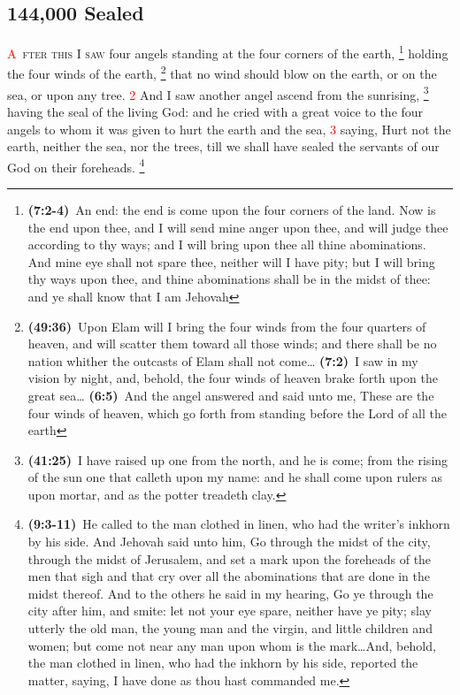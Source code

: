 \documentclass[12pt,twoside]{memoir}
\newcommand{\cbibleref}[3]{\textbf{\ibibleverse{#1}(#2)}\ {#3}}
\newcommand{\cbiblefoot}[3]{\footnote{\cbibleref{#1}{#2}{#3}}}
\newcommand{\vnum}[1]{\textcolor{red}{\normalsize{#1}}}
\begin{document}
\subsection*{144,000 Sealed}
\lettrine[lines=3]{\textcolor{red}{A}}{\ fter this I saw} four angels standing at the four corners of the earth,
	\cbiblefoot{Ezekiel}{7:2-4}{An end: the end is come upon the four corners of the land. Now is the end upon thee, and I will send mine anger upon thee, and will judge thee according to thy ways; and I will bring upon thee all thine abominations. And mine eye shall not spare thee, neither will I have pity; but I will bring thy ways upon thee, and thine abominations shall be in the midst of thee: and ye shall know that I am Jehovah}
 holding the four winds of the earth,%
	\footnote{\cbibleref{Jeremiah}{49:36}{Upon Elam will I bring the four winds from the four quarters of heaven, and will scatter them toward all those winds; and there shall be no nation whither the outcasts of Elam shall not come}\ldots%
			 \cbibleref{Daniel}{7:2}{I saw in my vision by night, and, behold, the four winds of heaven brake forth upon the great sea}\ldots%
			 \cbibleref{Zechariah}{6:5}{And the angel answered and said unto me, These are the four winds of heaven, which go forth from standing before the Lord of all the earth}
			 }
 that no wind should blow on the earth, or on the sea, or upon any tree. %
\vnum{2} And I saw another angel ascend from the sunrising,%
	\cbiblefoot{Isaiah}{41:25}{I have raised up one from the north, and he is come; from the rising of the sun one that calleth upon my name: and he shall come upon rulers as upon mortar, and as the potter treadeth clay.}
 having the seal of the living God: and he cried with a great voice to the four angels to whom it was given to hurt the earth and the sea, %
\vnum{3} saying, Hurt not the earth, neither the sea, nor the trees, till we shall have sealed the servants of our God on their foreheads.%
	\cbiblefoot{Ezekiel}{9:3-11}{He called to the man clothed in linen, who had the writer’s inkhorn by his side. And Jehovah said unto him, Go through the midst of the city, through the midst of Jerusalem, and set a mark upon the foreheads of the men that sigh and that cry over all the abominations that are done in the midst thereof. And to the others he said in my hearing, Go ye through the city after him, and smite: let not your eye spare, neither have ye pity; slay utterly the old man, the young man and the virgin, and little children and women; but come not near any man upon whom is the mark\ldots And, behold, the man clothed in linen, who had the inkhorn by his side, reported the matter, saying, I have done as thou hast commanded me.} %
\end{document}
